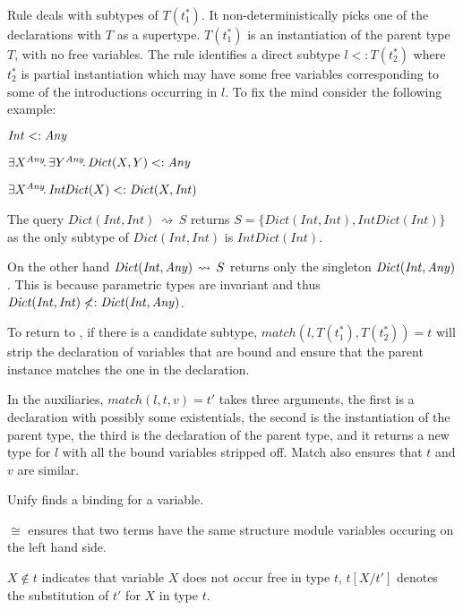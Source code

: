 \documentclass{paper}
\newcommand{\EM}[1]{\ensuremath{#1}\xspace}    %
\newcommand{\Gen}[2]{\EM{#1\,\rightsquigarrow\,#2}}  %
\newcommand{\Set}[1]{\EM{\{ #1\}}}                   %
\newcommand{\Exist}[2]{\EM{\exists #1\!.\,#2}}       %
\newcommand{\m}[1]{\EM{{#1^{*}}}}                     %
\renewcommand{\t}{\EM{t}}                            %
\newcommand{\X}{\EM{X}}                              %
\newcommand{\Y}{\EM{Y}}                              %
\newcommand{\Ty}[2]{\EM{#1(#2)}}                     %
\newcommand{\T}{\EM{T}}                              %
\newcommand{\TyT}[1]{\EM{\Ty \T{#1}}}                %
\renewcommand{\v}{\EM{v}}                            %
\renewcommand{\l}{\EM{l}}                            %
\newcommand{\Subst}[3]{\EM{#1[#2\!/#3]}}             %
\newcommand{\Match}[4]{\EM{\mathit{match}(#1,#2,#3) = #4}}
\begin{document}
Rule \RDeclare deals with subtypes of \TyT{\m{\t_1}}. It
non-deterministically picks one of the declarations with \T as a
supertype. \TyT{\m{\t_1}} is an instantiation of the parent type \T,
with no free variables. The rule identifies a direct subtype
$\l<:\TyT{\m{\t_2}}$ where \m{\t_2} is partial instantiation which may
have some free variables corresponding to some of the introductions
occurring in \l. To fix the mind consider the following example:

\newcommand{\Int}{\EM{\mathit{Int}}}

\newcommand{\Dict}{\EM{\mathit{Dict}}}
\newcommand{\IntDict}{\EM{\mathit{IntDict}}}


$\Int <: \Any$

$\Exist{\X^\Any}{\Exist{\Y^\Any}{\Ty\Dict{\X,\Y}}} <: \Any$

$\Exist{\X^\Any}{\Ty\IntDict{\X}} <: \Ty\Dict{\X, \Int}$

The query \Gen{\Ty\Dict{\Int,\Int}}S returns
$S=\Set{\Ty\Dict{\Int,\Int}, \Ty\IntDict{\Int}}$ as the only subtype
of \Ty\Dict{\Int,\Int} is \Ty\IntDict{\Int}.

On the other hand \Gen{\Ty\Dict{\Int,\Any}}S returns only the
singleton \Ty\Dict{\Int,\Any}. This is because parametric types are
invariant and thus $\Ty\Dict{\Int,\Int} \not<: \Ty\Dict{\Int,\Any}$.

To return to \RDeclare, if there is a candidate subtype,
\Match\l{\TyT{\m{\t_1}}}{\TyT{\m{\t_2}}}\t will strip the declaration
of variables that are bound and ensure that the parent instance
matches the one in the declaration.

In the auxiliaries, \Match\l\t\v{\t'} takes three arguments, the first
is a declaration with possibly some existentials, the second is the
instantiation of the parent type, the third is the declaration of the
parent type, and it returns a new type for \l with all the bound
variables stripped off. Match also ensures that \t and \v are similar.

Unify finds a binding for a variable.

$\cong$ ensures that two terms have the same structure module
variables occuring on the left hand side.

$\X\not\in\t$ indicates that variable \X does not occur free in type
\t, \Subst\t\X{\t'} denotes the substitution of $\t'$ for \X in type
\t.
\end{document}
